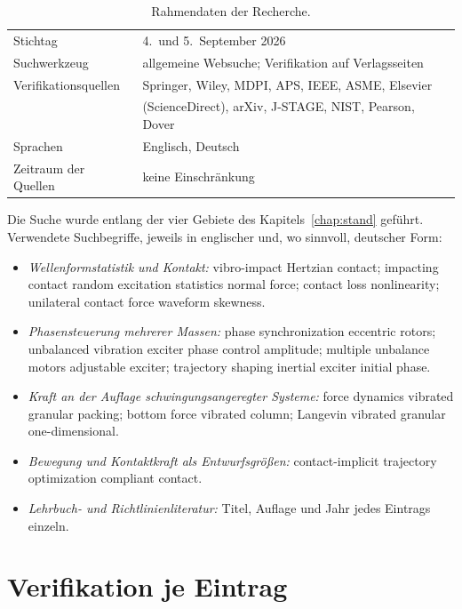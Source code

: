 \documentclass[12pt,a4paper]{report}
\begin{document}
\begin{table}[htbp]
  \centering
  \begin{tabular}{ll}
    \hline
    Stichtag & 4.\ und 5.\ September 2026 \\
    Suchwerkzeug & allgemeine Websuche; Verifikation auf Verlagsseiten \\
    Verifikationsquellen & Springer, Wiley, MDPI, APS, IEEE, ASME, Elsevier \\
                         & (ScienceDirect), arXiv, J-STAGE, NIST, Pearson, Dover \\
    Sprachen & Englisch, Deutsch \\
    Zeitraum der Quellen & keine Einschränkung \\
    \hline
  \end{tabular}
  \caption{Rahmendaten der Recherche.}
\end{table}

Die Suche wurde entlang der vier Gebiete des Kapitels~\ref{chap:stand}
geführt. Verwendete Suchbegriffe, jeweils in englischer und, wo
sinnvoll, deutscher Form:

\begin{itemize}
\item \emph{Wellenformstatistik und Kontakt:} vibro-impact Hertzian
      contact; impacting contact random excitation statistics normal
      force; contact loss nonlinearity; unilateral contact force
      waveform skewness.
\item \emph{Phasensteuerung mehrerer Massen:} phase synchronization
      eccentric rotors; unbalanced vibration exciter phase control
      amplitude; multiple unbalance motors adjustable exciter; trajectory
      shaping inertial exciter initial phase.
\item \emph{Kraft an der Auflage schwingungsangeregter Systeme:} force
      dynamics vibrated granular packing; bottom force vibrated column;
      Langevin vibrated granular one-dimensional.
\item \emph{Bewegung und Kontaktkraft als Entwurfsgrößen:}
      contact-implicit trajectory optimization compliant contact.
\item \emph{Lehrbuch- und Richtlinienliteratur:} Titel, Auflage und
      Jahr jedes Eintrags einzeln.
\end{itemize}

\section{Verifikation je Eintrag}
\end{document}
